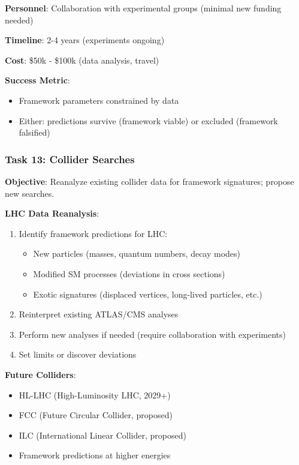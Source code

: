 \textbf{Personnel}: Collaboration with experimental groups (minimal new funding needed)

\textbf{Timeline}: 2-4 years (experiments ongoing)

\textbf{Cost}: \$50k - \$100k (data analysis, travel)

\textbf{Success Metric}:
\begin{itemize}
    \item Framework parameters constrained by data
    \item Either: predictions survive (framework viable) or excluded (framework falsified)
\end{itemize}

\subsubsection{Task 13: Collider Searches}

\textbf{Objective}: Reanalyze existing collider data for framework signatures; propose new searches.

\textbf{LHC Data Reanalysis}:
\begin{enumerate}
    \item Identify framework predictions for LHC:
    \begin{itemize}
        \item New particles (masses, quantum numbers, decay modes)
        \item Modified SM processes (deviations in cross sections)
        \item Exotic signatures (displaced vertices, long-lived particles, etc.)
    \end{itemize}

    \item Reinterpret existing ATLAS/CMS analyses
    \item Perform new analyses if needed (require collaboration with experiments)
    \item Set limits or discover deviations
\end{enumerate}

\textbf{Future Colliders}:
\begin{itemize}
    \item HL-LHC (High-Luminosity LHC, 2029+)
    \item FCC (Future Circular Collider, proposed)
    \item ILC (International Linear Collider, proposed)
    \item Framework predictions at higher energies
\end{itemize}

